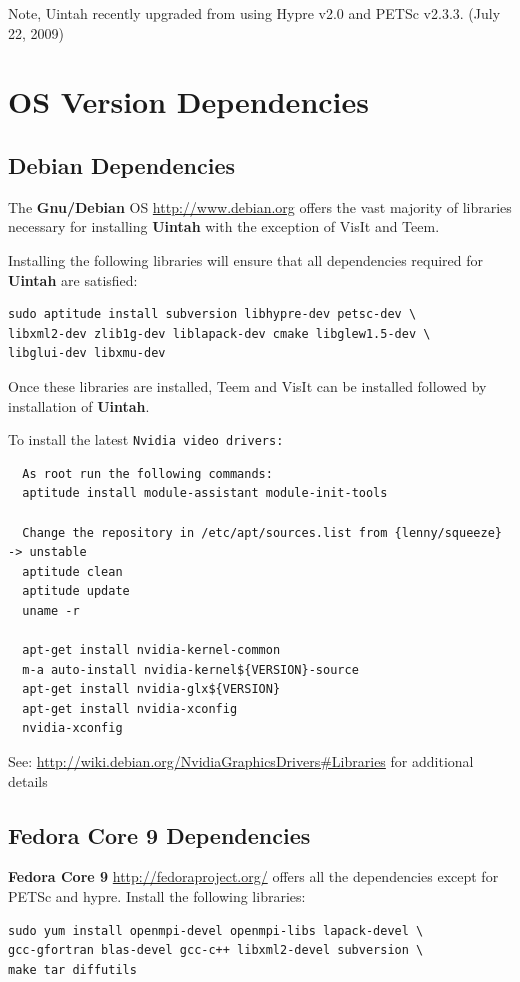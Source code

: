 \documentclass[12pt]{article}
\newcommand{\TT}[1]{\tt{#1} \normalfont}
\begin{document}
Note, Uintah recently upgraded from using Hypre v2.0 and PETSc
v2.3.3.  (July 22, 2009)

\section{OS Version Dependencies}

\subsection{Debian Dependencies}
\label{sec:debian_dependencies}
The \textbf{Gnu/Debian} OS \url{http://www.debian.org} offers the vast majority of libraries necessary for
installing \textbf{Uintah} with the exception of VisIt and Teem.

Installing the following libraries will ensure that all dependencies
required for \textbf{Uintah} are satisfied: 

\begin{verbatim} 
sudo aptitude install subversion libhypre-dev petsc-dev \ 
libxml2-dev zlib1g-dev liblapack-dev cmake libglew1.5-dev \
libglui-dev libxmu-dev
\end{verbatim}

Once these libraries are installed, Teem and VisIt can be installed
followed by installation of \textbf{Uintah}.

To install the latest \TT{Nvidia}video drivers:
\begin{verbatim}
  As root run the following commands:
  aptitude install module-assistant module-init-tools
  
  Change the repository in /etc/apt/sources.list from {lenny/squeeze} -> unstable
  aptitude clean
  aptitude update
  uname -r
  
  apt-get install nvidia-kernel-common
  m-a auto-install nvidia-kernel${VERSION}-source
  apt-get install nvidia-glx${VERSION}
  apt-get install nvidia-xconfig
  nvidia-xconfig
\end{verbatim}
See: \url{http://wiki.debian.org/NvidiaGraphicsDrivers#Libraries} for additional details

\subsection{Fedora Core 9 Dependencies}

\textbf{Fedora Core 9} \url{http://fedoraproject.org/} offers all the
dependencies except for PETSc and hypre.  Install the following
libraries:
\begin{verbatim}
sudo yum install openmpi-devel openmpi-libs lapack-devel \
gcc-gfortran blas-devel gcc-c++ libxml2-devel subversion \ 
make tar diffutils
\end{verbatim}
\end{document}
